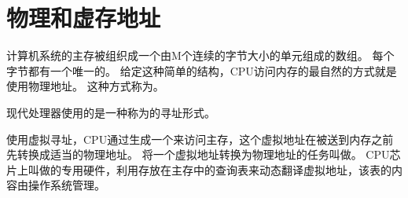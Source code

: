 
\section{物理和虚存地址}
{
    计算机系统的主存被组织成一个由M个连续的字节大小的单元组成的数组。
    每个字节都有一个唯一的。
    给定这种简单的结构，CPU访问内存的最自然的方式就是使用物理地址。
    这种方式称为。

    现代处理器使用的是一种称为的寻址形式。

    使用虚拟寻址，CPU通过生成一个来访问主存，这个虚拟地址在被送到内存之前先转换成适当的物理地址。
    将一个虚拟地址转换为物理地址的任务叫做。
    CPU芯片上叫做的专用硬件，利用存放在主存中的查询表来动态翻译虚拟地址，该表的内容由操作系统管理。
}

